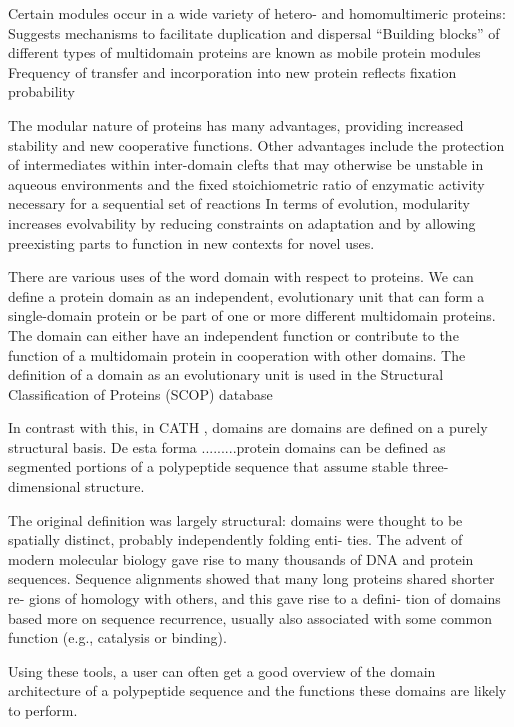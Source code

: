 Certain modules occur in a wide variety of hetero- and homomultimeric proteins:
Suggests mechanisms to facilitate duplication and dispersal
“Building blocks” of different types of multidomain proteins are known as mobile protein modules
Frequency of transfer and incorporation into new protein reflects fixation probability


The modular nature of proteins has many advantages, providing increased stability and new cooperative functions.
Other advantages include the protection of intermediates within inter-domain clefts that may otherwise be unstable in aqueous environments and the fixed stoichiometric ratio of enzymatic activity necessary for a sequential set of reactions
In terms of evolution, modularity increases evolvability by reducing constraints on adaptation and by allowing preexisting parts to function in new contexts for novel uses.

There are various uses of the word domain with respect to proteins. 
We can define a protein domain as an independent, evolutionary unit that can form a single-domain protein or be part of one or more different multidomain proteins. The domain can either have an independent
function or contribute to the function of a multidomain protein in cooperation with other domains. 
The definition of a domain as an evolutionary unit is used in the Structural Classification of Proteins (SCOP) database \cite{murzin1995scop}

In contrast with this, in CATH \cite{orengo1997cath}, domains are domains are defined on a purely structural basis.
De esta forma .........protein domains can be defined as segmented portions of a polypeptide sequence that assume stable three-dimensional structure.

The original definition was largely structural: domains were thought
to be spatially distinct, probably independently folding enti-
ties. The advent of modern molecular biology gave rise to
many thousands of DNA and protein sequences. Sequence
alignments showed that many long proteins shared shorter re-
gions of homology with others, and this gave rise to a defini-
tion of domains based more on sequence recurrence, usually
also associated with some common function (e.g., catalysis
or binding). 

Using these
tools, a user can often get a good overview of the domain
architecture of a polypeptide sequence and the functions these
domains are likely to perform.




